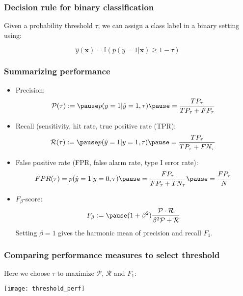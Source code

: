\documentclass[smaller]{beamer}
\newcommand{\?}{\stackrel{?}{=}}
\newcommand{\fr}{\frac}
\newcommand{\mc}{\mathcal}
\begin{document}
\begin{frame}
  \frametitle{Decision rule for binary classification}
  Given a probability threshold $\tau$, we can assign a class label in a binary setting using:
  \pause

  \begin{equation}
    \hat y (\bm x) = \mathbb{I}(p(y = 1|\bm x) \ge 1 - \tau)
  \end{equation}

  
\end{frame}


\begin{frame}
  \frametitle{Summarizing performance}
  \pause

  \begin{itemize}
  \item Precision:\pause
    \begin{equation}
      \mathcal{P}(\tau) := \pause p(y=1|\hat y = 1,\tau) \pause = \fr{TP_{\tau}}{TP_{\tau} + FP_{\tau}}
    \end{equation}
    \pause
  \item Recall (sensitivity, hit rate, true positive rate (TPR):\pause
    \begin{equation}
      \mathcal{R}(\tau) := \pause p(\hat y=1|y = 1,\tau) \pause = \fr{TP_{\tau}}{TP_{\tau} + FN_{\tau}}
    \end{equation}
    \pause

  \item False positive rate (FPR, false alarm rate, type I error rate):\pause
    \begin{equation}
      FPR(\tau) = p(\hat y = 1|y = 0, \tau) \pause = \fr{FP_{\tau}}{FP_{\tau} + TN_{\tau}}  \pause = \fr{FP_{\tau}}{N}
    \end{equation}

    \pause
  \item $F_{\beta}$-score: \pause
    \begin{equation}
      F_{\beta} := \pause (1+\beta^{2})\fr{\mc{P}\cdot\mc{R}}{\beta^{2}\mc{P} + \mc{R}}
    \end{equation}
    \pause
    Setting $\beta = 1$ gives the harmonic mean of precision and recall $F_{1}$.
  \end{itemize}
\end{frame}

 \begin{frame}
   \frametitle{Comparing performance measures to select threshold} \pause

   Here we choose $\tau$ to maximize $\mc{P}$,
   $\mc{R}$ and $F_{1}$:

      \begin{center} \texttt{[image: threshold\_perf]}
      \end{center}
    \end{frame}
    
\end{document}
